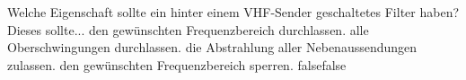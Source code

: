    {Welche Eigenschaft sollte ein hinter einem VHF-Sender geschaltetes Filter haben? Dieses sollte...}
    {den gewünschten Frequenzbereich durchlassen.}
    {alle Oberschwingungen durchlassen.}
    {die Abstrahlung aller Nebenaussendungen zulassen.}
    {den gewünschten Frequenzbereich sperren.}
    {false}{false}